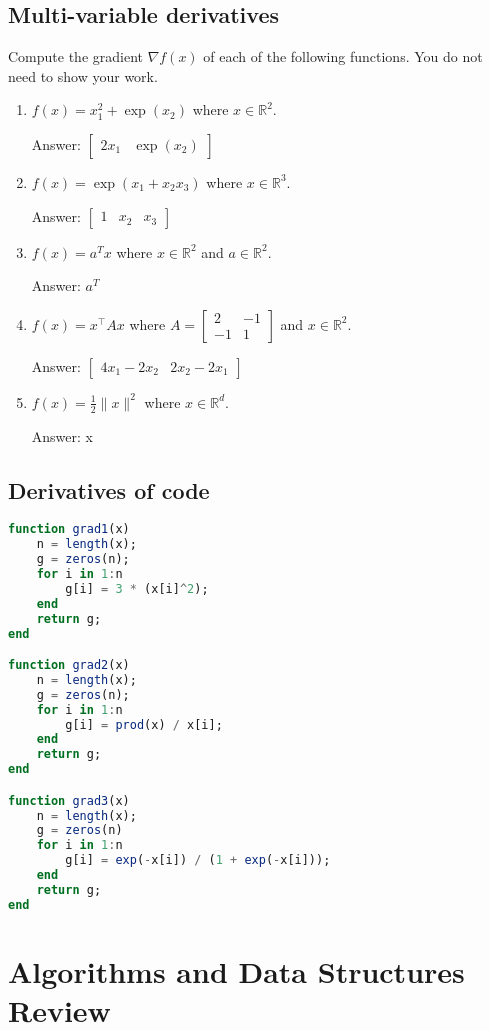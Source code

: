 \documentclass{article}
\def\ans#1{\par\gre{Answer: #1}}
\def\blu#1{{\color{blu}#1}}
\def\gre#1{{\color{gre}#1}}
\def\norm#1{\|#1\|}
\def\R{\mathbb{R}}
\begin{document}
\subsection{Multi-variable derivatives}

\blu{Compute the gradient $\nabla f(x)$ of each of the following functions.} You do not need to show your work.
\begin{enumerate}
\item $f(x) = x_1^2 + \exp(x_2)$ where $x \in \R^2$.
\ans{$\left[\begin{array}{cc} 2x_1 & \exp(x_2) \end{array}\right]$}
\item $f(x) = \exp(x_1 + x_2x_3)$ where $x \in \mathbb{R}^3$.
\ans{$\left[\begin{array}{ccc} 1 & x_2 & x_3 \end{array}\right]$}
\item $f(x) = a^Tx$ where $x \in \R^2$ and $a \in \R^2$.
\ans{$a^T$}
\item $f(x) = x^\top A x$ where $A=\left[ \begin{array}{cc}
2 & -1 \\
 -1 & 1 \end{array} \right]$ and $x \in \mathbb{R}^2$.
\ans{$\left[\begin{array}{cc} 4x_1 - 2x_2 & 2x_2 - 2x_1 \end{array}\right]$}
\item $f(x) = \frac{1}{2}\norm{x}^2$ where $x \in \R^d$.
\ans{x}
\end{enumerate}

\subsection{Derivatives of code}

\begin{lstlisting}[language=julia, frame=single]
function grad1(x)
	n = length(x);
	g = zeros(n);
	for i in 1:n
		g[i] = 3 * (x[i]^2);
	end
	return g;
end

function grad2(x)
	n = length(x);
	g = zeros(n);
	for i in 1:n
		g[i] = prod(x) / x[i];
	end
	return g;
end

function grad3(x)
	n = length(x);
	g = zeros(n)
	for i in 1:n
		g[i] = exp(-x[i]) / (1 + exp(-x[i]));
	end
	return g;
end
\end{lstlisting}

\section{Algorithms and Data Structures Review}
\end{document}

